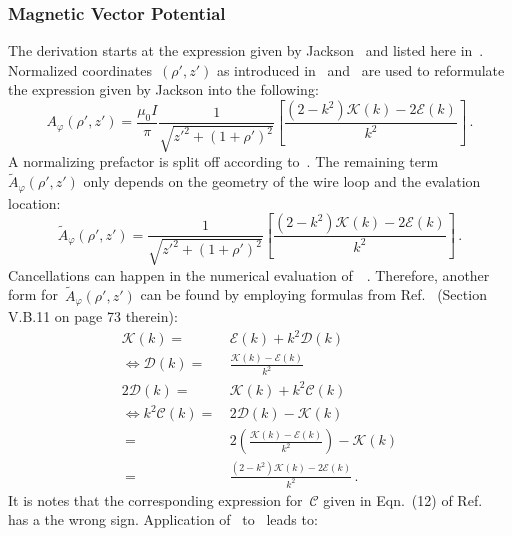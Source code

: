 \subsubsection{Magnetic Vector Potential}
The derivation starts at the expression given by Jackson~\cite{jackson}
and listed here in~.
Normalized coordinates~$(\rho', z')$ as introduced in~ and~
are used to reformulate the expression given by Jackson into the following:
\begin{equation}
 A_\varphi(\rho', z')
   = \frac{\mu_0 I}{\pi}
     \frac{1}{\sqrt{z'^2 + (1 + \rho')^2}}
     \left[ \frac{(2 - k^2)\mathcal{K}(k) - 2 \mathcal{E}(k)}{k^2} \right] \, . \label{eqn:cwl_A_phi_initial}
\end{equation}
A normalizing prefactor is split off according to~.
The remaining term~$\tilde{A}_\varphi(\rho',z')$ only depends on the geometry of the wire loop
and the evalation location:
\begin{equation}
  \tilde{A}_\varphi(\rho', z')
  = \frac{1}{\sqrt{z'^2 + (1 + \rho')^2}}
    \left[ \frac{(2 - k^2)\mathcal{K}(k) - 2 \mathcal{E}(k)}{k^2} \right] \, . \label{eqn:aNormJackson}
\end{equation}
Cancellations can happen in the numerical evaluation of~~\cite{bulirsch_3}.
Therefore, another form for~$\tilde{A}_\varphi(\rho',z')$ can be found by employing
formulas from Ref.~\cite{jahnke_emde} (Section V.B.11 on page 73 therein):
\begin{align}
                 \mathcal{K}(k) =&\, \mathcal{E}(k) + k^2 \mathcal{D}(k) \nonumber \\
 \Leftrightarrow \mathcal{D}(k) =&\, \frac{\mathcal{K}(k) - \mathcal{E}(k)}{k^2} \\
               2 \mathcal{D}(k) =&\, \mathcal{K}(k) + k^2 \mathcal{C}(k) \nonumber \\
 \Leftrightarrow k^2 \mathcal{C}(k) =&\, 2 \mathcal{D}(k) - \mathcal{K}(k) \nonumber \\
                     ~              =&\, 2 \left( \frac{\mathcal{K}(k) - \mathcal{E}(k)}{k^2} \right) - \mathcal{K}(k) \nonumber \\
                     ~              =&\, \frac{(2 - k^2) \mathcal{K}(k) - 2 \mathcal{E}(k)}{k^2} \, . \label{eqn:kSqC}
\end{align}
It is notes that the corresponding expression for~$\mathcal{C}$ given in Eqn.~(12) of Ref.~\cite{walstrom_2017}
has a the wrong sign.
Application of~ to~ leads to:
